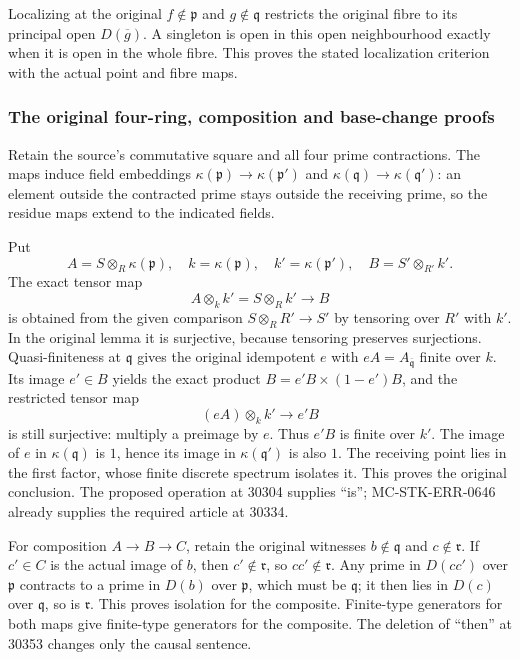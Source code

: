 Localizing at the original \(f\notin\mathfrak p\) and \(g\notin\mathfrak q\) restricts the original fibre to its principal open \(D(\overline g)\). A singleton is open in this open neighbourhood exactly when it is open in the whole fibre. This proves the stated localization criterion with the actual point and fibre maps.

\subsubsection{The original four-ring, composition and base-change proofs}\label{the-original-four-ring-composition-and-base-change-proofs}

Retain the source's commutative square and all four prime contractions. The maps induce field embeddings \(\kappa(\mathfrak p)\to\kappa(\mathfrak p')\) and \(\kappa(\mathfrak q)\to\kappa(\mathfrak q')\): an element outside the contracted prime stays outside the receiving prime, so the residue maps extend to the indicated fields.

Put \[
 A=S\otimes_R\kappa(\mathfrak p),\quad
 k=\kappa(\mathfrak p),\quad k'=\kappa(\mathfrak p'),\quad
 B=S'\otimes_{R'}k'.
\] The exact tensor map \[
 A\otimes_k k'=S\otimes_R k'\longrightarrow B
\] is obtained from the given comparison \(S\otimes_RR'\to S'\) by tensoring over \(R'\) with \(k'\). In the original lemma it is surjective, because tensoring preserves surjections. Quasi-finiteness at \(\mathfrak q\) gives the original idempotent \(e\) with \(eA=A_{\overline{\mathfrak q}}\) finite over \(k\). Its image \(e'\in B\) yields the exact product \(B=e'B\times(1-e')B\), and the restricted tensor map \[
 (eA)\otimes_k k'\longrightarrow e'B
\] is still surjective: multiply a preimage by \(e\). Thus \(e'B\) is finite over \(k'\). The image of \(e\) in \(\kappa(\mathfrak q)\) is \(1\), hence its image in \(\kappa(\mathfrak q')\) is also \(1\). The receiving point lies in the first factor, whose finite discrete spectrum isolates it. This proves the original conclusion. The proposed operation at 30304 supplies ``is''; MC-STK-ERR-0646 already supplies the required article at 30334.

For composition \(A\to B\to C\), retain the original witnesses \(b\notin\mathfrak q\) and \(c\notin\mathfrak r\). If \(c'\in C\) is the actual image of \(b\), then \(c'\notin\mathfrak r\), so \(cc'\notin\mathfrak r\). Any prime in \(D(cc')\) over \(\mathfrak p\) contracts to a prime in \(D(b)\) over \(\mathfrak p\), which must be \(\mathfrak q\); it then lies in \(D(c)\) over \(\mathfrak q\), so is \(\mathfrak r\). This proves isolation for the composite. Finite-type generators for both maps give finite-type generators for the composite. The deletion of ``then'' at 30353 changes only the causal sentence.

